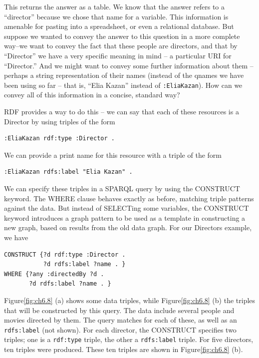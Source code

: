 This returns the answer as a table. We know that the answer refers to a
``director'' because we chose that name for a variable. This information
is amenable for pasting into a spreadsheet, or even a relational
database. But suppose we wanted to convey the answer to this question in
a more complete way--we want to convey the fact that these people are
directors, and that by ``Director'' we have a very specific meaning in
mind -- a particular URI for ``Director.'' And we might want to convey
some further information about them -- perhaps a string representation
of their names (instead of the qnames we have been using so far -- that
is, ``Elia Kazan'' instead of \texttt{:EliaKazan}). How can we convey all of this
information in a concise, standard way?

RDF provides a way to do this -- we can say that each of these resources
is a Director by using triples of the form

\begin{lstlisting}
:EliaKazan rdf:type :Director .
\end{lstlisting}

We can provide a print name for this resource with a triple of the form

\begin{lstlisting}
:EliaKazan rdfs:label "Elia Kazan" .
\end{lstlisting}

We can specify these triples in a SPARQL query by using the CONSTRUCT
keyword. The WHERE clause behaves exactly as before, matching triple
patterns against the data. But instead of SELECTing some variables, the
CONSTRUCT keyword introduces a graph pattern to be used as a template in
constructing a new graph, based on results from the old data graph. For
our Directors example, we have

\begin{lstlisting}
CONSTRUCT {?d rdf:type :Director .
           ?d rdfs:label ?name . }
WHERE {?any :directedBy ?d .
       ?d rdfs:label ?name . }
\end{lstlisting}

Figure\ref{fig:ch6.8} (a) shows some data triples, while Figure\ref{fig:ch6.8} (b) the triples
that will be constructed by this query. The data include several people
and movies directed by them. The query matches for each of these, as
well as an \texttt{rdfs:label} (not shown). For each director, the CONSTRUCT
specifies two triples; one is a \texttt{rdf:type} triple, the other a \texttt{rdfs:label}
triple. For five directors, ten triples were produced. These ten triples
are shown in Figure\ref{fig:ch6.8} (b).

